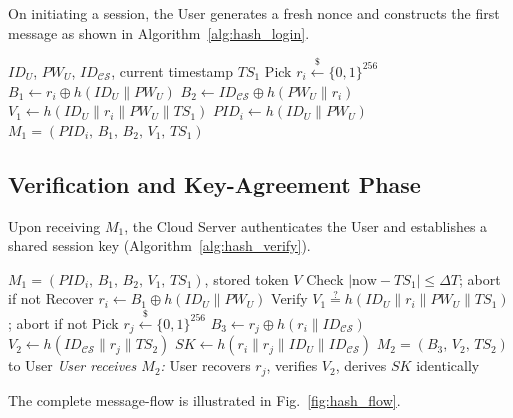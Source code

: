 \documentclass[journal]{IEEEtran}
\newcommand{\ID}{\mathit{ID}}          %
\newcommand{\nonce}{r}                 %
\newcommand{\SK}{\mathit{SK}}          %
\newcommand{\PW}{\mathit{PW}}          %
\newcommand{\h}[1]{h(#1)}             %
\newcommand{\xor}{\oplus}             %
\newcommand{\PID}{\mathit{PID}}        %
\newcommand{\TS}{\mathit{TS}}          %
\newcommand{\CS}{\mathcal{CS}}         %
\begin{document}
On initiating a session, the User generates a fresh nonce and constructs the
first message as shown in Algorithm~\ref{alg:hash_login}.

\begin{algorithm}[!t]
\caption{Hash+XOR Login Phase (User side)}
\label{alg:hash_login}
\begin{algorithmic}[1]
\Require $\ID_U$, $\PW_U$, $\ID_\CS$, current timestamp $\TS_1$
\State Pick $\nonce_i \xleftarrow{\$} \{0,1\}^{256}$
\State $B_1 \leftarrow \nonce_i \xor \h{\ID_U \| \PW_U}$
\State $B_2 \leftarrow \ID_\CS \xor \h{\PW_U \| \nonce_i}$
\State $V_1 \leftarrow \h{\ID_U \| \nonce_i \| \PW_U \| \TS_1}$
\State $\PID_i \leftarrow \h{\ID_U \| \PW_U}$  
\State \Return $M_1 = (\PID_i,\, B_1,\, B_2,\, V_1,\, \TS_1)$  
\end{algorithmic}
\end{algorithm}

\subsection{Verification and Key-Agreement Phase}

Upon receiving $M_1$, the Cloud Server authenticates the User and establishes
a shared session key (Algorithm~\ref{alg:hash_verify}).

\begin{algorithm}[!t]
\caption{Hash+XOR Verification \& Key Agreement (CS side)}
\label{alg:hash_verify}
\begin{algorithmic}[1]
\Require $M_1 = (\PID_i,\, B_1,\, B_2,\, V_1,\, \TS_1)$, stored token $V$
\State Check $|\text{now} - \TS_1| \leq \Delta T$; abort if not
\State Recover $\nonce_i \leftarrow B_1 \xor \h{\ID_U \| \PW_U}$
\State Verify $V_1 \overset{?}{=} \h{\ID_U \| \nonce_i \| \PW_U \| \TS_1}$; abort if not
\State Pick $\nonce_j \xleftarrow{\$} \{0,1\}^{256}$
\State $B_3 \leftarrow \nonce_j \xor \h{\nonce_i \| \ID_\CS}$
\State $V_2 \leftarrow \h{\ID_\CS \| \nonce_j \| \TS_2}$
\State $\SK \leftarrow \h{\nonce_i \| \nonce_j \| \ID_U \| \ID_\CS}$
\State \Return $M_2 = (B_3,\, V_2,\, \TS_2)$ to User  
\Statex \textit{User receives $M_2$:}
\State User recovers $\nonce_j$, verifies $V_2$, derives $\SK$ identically
\end{algorithmic}
\end{algorithm}

The complete message-flow is illustrated in Fig.~\ref{fig:hash_flow}.
\end{document}
